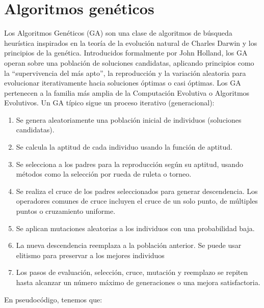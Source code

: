\section{Algoritmos genéticos}

Los Algoritmos Genéticos (GA) son una clase de algoritmos de búsqueda heurística inspirados en la teoría de la evolución natural de Charles Darwin y los principios de la genética. Introducidos formalmente por John Holland, los GA operan sobre una población de soluciones candidatas, aplicando principios como la “supervivencia del más apto”, la reproducción y la variación aleatoria para evolucionar iterativamente hacia soluciones óptimas o casi óptimas. Los GA pertenecen a la familia más amplia de la Computación Evolutiva o Algoritmos Evolutivos. Un GA típico sigue un proceso iterativo (generacional):
\newpage
\begin{enumerate}
    \item {} Se genera aleatoriamente una población inicial de individuos (soluciones candidatas).
    \item {} Se calcula la aptitud de cada individuo usando la función de aptitud.
    \item {} Se selecciona a los padres para la reproducción según su aptitud, usando métodos como la selección por rueda de ruleta o torneo.
    \item {} Se realiza el cruce de los padres seleccionados para generar descendencia. Los operadores comunes de cruce incluyen el cruce de un solo punto, de múltiples puntos o cruzamiento uniforme.
    \item {} Se aplican mutaciones aleatorias a los individuos con una probabilidad baja.
    \item {} La nueva descendencia reemplaza a la población anterior. Se puede usar elitismo para preservar a los mejores individuos
    \item {} Los pasos de evaluación, selección, cruce, mutación y reemplazo se repiten hasta alcanzar un número máximo de generaciones o una mejora satisfactoria.
\end{enumerate}
En pseudocódigo, tenemos que:
